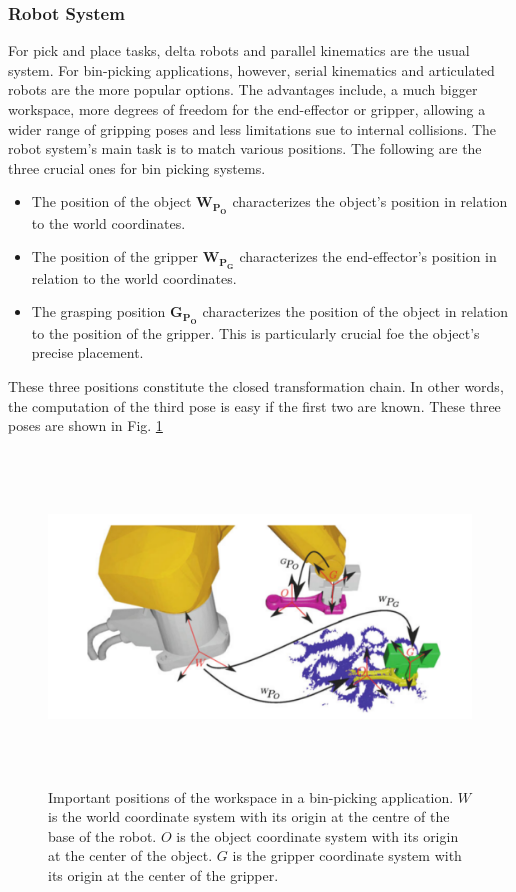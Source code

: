 \subsubsection{Robot System}
For pick and place tasks, delta robots and parallel kinematics are the usual system. For bin-picking applications, however, serial kinematics and articulated robots are the more popular options. The advantages include, a much bigger workspace, more degrees of freedom for the end-effector or gripper, allowing a wider range of gripping poses and less limitations sue to internal collisions. The robot system's main task is to match various positions. The following are the three crucial ones for bin picking systems.\cite{spenrath2022heuristic}
\begin{itemize}
  \item The position of the object $\mathbf{W_{P_O}}$ characterizes the object's position in relation to the world coordinates.
  \item The position of the gripper $\mathbf{W_{P_G}}$ characterizes the end-effector's position in relation to the world coordinates.
  \item The grasping position $\mathbf{G_{P_O}}$ characterizes the position of the object in relation to the position of the gripper. This is particularly crucial foe the object's precise placement. 
\end{itemize}
These three positions constitute the closed transformation chain. In other words, the computation of the third pose is easy if the first two are known. These three poses are shown in Fig. \ref{fig:robot_workspace}
\begin{figure}[t]
  \centering
  \includegraphics[width=400pt,height=250pt]{pictures/robot_pose.PNG}
  \caption{Important positions of the workspace in a  bin-picking application. $W$ is the world coordinate system with its origin at the centre of the base of the robot. $O$ is the object coordinate system with its origin at the center of the object. $G$ is the gripper coordinate system with its origin at the center of the gripper.\cite{buchholz2015bin}}
  \label{fig:robot_workspace}
\end{figure}
